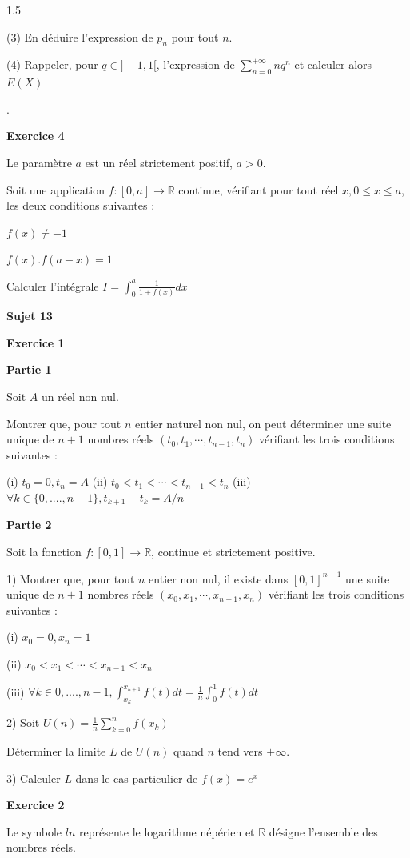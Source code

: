 \documentclass[12pt]{article}
\begin{document}
\begin{spacing}{1.5}
{ (3) En déduire l'expression de $p_n$ pour tout $n$.
 
 (4) Rappeler, pour $q \in ]-1,1[$, l'expression de       
$\sum_{n=0}^{+\infty}nq^n$ et calculer alors $E(X)$}.

\medskip\textbf{Exercice 4}

Le paramètre $a$ est un réel strictement positif, $a > 0$. 

Soit une application $f : [0,a]\longrightarrow \mathbb{R}$ continue, vérifiant pour tout réel $x, 0 \leq x \leq a$, les deux conditions suivantes : 

$f(x)\neq -1$

$f(x).f(a-x)=1$

 Calculer l'intégrale $I = \int_{0}^{a}\frac{1}{1+f(x)}dx$

\quad
\quad
\medskip\textbf{Sujet 13}

\medskip\textbf{Exercice 1}

\textbf{Partie 1}

Soit $A$ un réel non nul. 

Montrer que, pour tout $n$ entier naturel non nul, on peut déterminer une suite unique de $n+1$ 
nombres réels $(t_0, t_1,\cdots, t_{n-1},t_n)$ vérifiant les trois conditions suivantes : 

(i)    $t_0 = 0, t_n = A$ 
(ii)   $t_0 < t_1 < \cdots<t_{n-1} < t_n$
(iii)  $\forall k\in \lbrace 0, ...., n-1\rbrace, t_{k+1}-t_{k}= A/n$

\textbf{Partie 2}

Soit la fonction $f : [0,1]\longrightarrow \mathbb{R}$, continue et strictement positive. 

1) Montrer que, pour tout $n$ entier non nul, il existe dans $[0,1]^{n+1}$ une suite unique de $n+1$ 
nombres réels $(x_0, x_1,\cdots,x_{n-1},  x_n)$ vérifiant les trois conditions suivantes : 

(i)  $x_0 = 0, x_n = 1$

(ii) $x_0 < x_1 < \cdots<x_{n-1} < x_n$

(iii) $\forall k \in {0, ...., n-1}, \int_{x_k}^{x_{k+1}}f(t)dt=\frac{1}{n}\int_{0}^{1}f(t)dt$
 
2) Soit $U(n) = \frac{1}{n}\sum_{k=0}^{n}f(x_k)$ 

Déterminer la limite $L$ de $U(n)$ quand $n$ tend vers $+\infty$. 

3) Calculer $L$ dans le cas particulier de $f(x) = e^x$

\medskip\textbf{Exercice 2}

Le symbole $ln$ représente le logarithme népérien et $\mathbb{R}$ désigne l'ensemble des nombres réels. 


\end{spacing}
\end{document}
